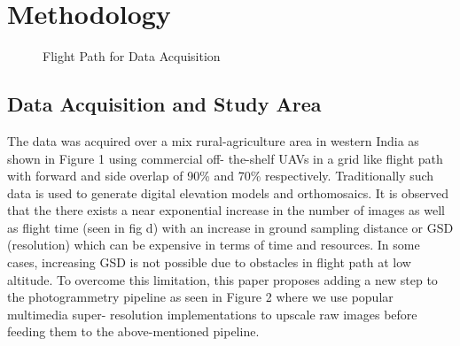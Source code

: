 \documentclass[conference]{IEEEtran}
\begin{document}
\section{Methodology}

\begin{figure}[htbp]
    \caption{Flight Path for Data Acquisition}
    \label{fig1}
\end{figure}


\subsection{Data Acquisition and Study Area}

The data was acquired over a mix rural-agriculture area in
western India as shown in Figure 1 using commercial off-
the-shelf UAVs in a grid like flight path with forward and
side overlap of 90\% and 70\% respectively. Traditionally
such data is used to generate digital elevation models and
orthomosaics. It is observed that the there exists a near
exponential increase in the number of images as well as
flight time (seen in fig d) with an increase in ground
sampling distance or GSD (resolution) which can be
expensive in terms of time and resources. In some cases,
increasing GSD is not possible due to obstacles in flight
path at low altitude. To overcome this limitation, this paper
proposes adding a new step to the photogrammetry pipeline
as seen in Figure 2 where we use popular multimedia super-
resolution implementations to upscale raw images before
feeding them to the above-mentioned pipeline.
\end{document}
